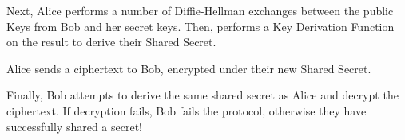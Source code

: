 \documentclass[conference]{IEEEtran}
\begin{document}
Next, Alice performs a number of Diffie-Hellman exchanges between the public Keys from Bob and her secret keys. Then, performs a Key Derivation Function on the result to derive their Shared Secret.
\newline
\newline
{}
\newline
\newline

Alice sends a ciphertext to Bob, encrypted under their new Shared Secret.
\newline
\newline
{}
\newline
\newline

Finally, Bob attempts to derive the same shared secret as Alice and decrypt the ciphertext. If decryption fails, Bob fails the protocol, otherwise they have successfully shared a secret!
\newline
\newline
{}
\end{document}

